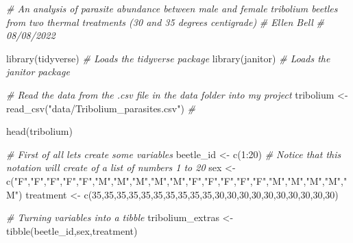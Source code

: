 \documentclass[
]{book}
\newenvironment{Shaded}{\begin{snugshade}}{\end{snugshade}}
\newcommand{\CommentTok}[1]{\textcolor[rgb]{0.56,0.35,0.01}{\textit{#1}}}
\newcommand{\DecValTok}[1]{\textcolor[rgb]{0.00,0.00,0.81}{#1}}
\newcommand{\FunctionTok}[1]{\textcolor[rgb]{0.00,0.00,0.00}{#1}}
\newcommand{\NormalTok}[1]{#1}
\newcommand{\OtherTok}[1]{\textcolor[rgb]{0.56,0.35,0.01}{#1}}
\newcommand{\SpecialCharTok}[1]{\textcolor[rgb]{0.00,0.00,0.00}{#1}}
\newcommand{\StringTok}[1]{\textcolor[rgb]{0.31,0.60,0.02}{#1}}
\begin{document}
\begin{Shaded}
\begin{Highlighting}[]
\CommentTok{\# An analysis of parasite abundance between male and female tribolium beetles from two thermal treatments (30 and 35 degrees centigrade)}
\CommentTok{\# Ellen Bell }
\CommentTok{\# 08/08/2022}

\FunctionTok{library}\NormalTok{(tidyverse) }\CommentTok{\# Loads the tidyverse package}
\FunctionTok{library}\NormalTok{(janitor) }\CommentTok{\# Loads the janitor package}

\CommentTok{\# Read the data from the .csv file in the data folder into my project}
\NormalTok{tribolium }\OtherTok{\textless{}{-}} \FunctionTok{read\_csv}\NormalTok{(}\StringTok{"data/Tribolium\_parasites.csv"}\NormalTok{) }\CommentTok{\#}

\FunctionTok{head}\NormalTok{(tribolium)}

\CommentTok{\# First of all lets create some variables}
\NormalTok{beetle\_id }\OtherTok{\textless{}{-}} \FunctionTok{c}\NormalTok{(}\DecValTok{1}\SpecialCharTok{:}\DecValTok{20}\NormalTok{) }\CommentTok{\# Notice that this notation will create of a list of numbers 1 to 20}
\NormalTok{sex }\OtherTok{\textless{}{-}} \FunctionTok{c}\NormalTok{(}\StringTok{"F"}\NormalTok{,}\StringTok{"F"}\NormalTok{,}\StringTok{"F"}\NormalTok{,}\StringTok{"F"}\NormalTok{,}\StringTok{"F"}\NormalTok{,}\StringTok{"M"}\NormalTok{,}\StringTok{"M"}\NormalTok{,}\StringTok{"M"}\NormalTok{,}\StringTok{"M"}\NormalTok{,}\StringTok{"M"}\NormalTok{,}\StringTok{"F"}\NormalTok{,}\StringTok{"F"}\NormalTok{,}\StringTok{"F"}\NormalTok{,}\StringTok{"F"}\NormalTok{,}\StringTok{"F"}\NormalTok{,}\StringTok{"M"}\NormalTok{,}\StringTok{"M"}\NormalTok{,}\StringTok{"M"}\NormalTok{,}\StringTok{"M"}\NormalTok{,}\StringTok{"M"}\NormalTok{)}
\NormalTok{treatment }\OtherTok{\textless{}{-}} \FunctionTok{c}\NormalTok{(}\DecValTok{35}\NormalTok{,}\DecValTok{35}\NormalTok{,}\DecValTok{35}\NormalTok{,}\DecValTok{35}\NormalTok{,}\DecValTok{35}\NormalTok{,}\DecValTok{35}\NormalTok{,}\DecValTok{35}\NormalTok{,}\DecValTok{35}\NormalTok{,}\DecValTok{35}\NormalTok{,}\DecValTok{35}\NormalTok{,}\DecValTok{30}\NormalTok{,}\DecValTok{30}\NormalTok{,}\DecValTok{30}\NormalTok{,}\DecValTok{30}\NormalTok{,}\DecValTok{30}\NormalTok{,}\DecValTok{30}\NormalTok{,}\DecValTok{30}\NormalTok{,}\DecValTok{30}\NormalTok{,}\DecValTok{30}\NormalTok{,}\DecValTok{30}\NormalTok{)}

\CommentTok{\# Turning variables into a tibble}
\NormalTok{tribolium\_extras }\OtherTok{\textless{}{-}} \FunctionTok{tibble}\NormalTok{(beetle\_id,sex,treatment)}


\end{Highlighting}
\end{Shaded}
\end{document}
